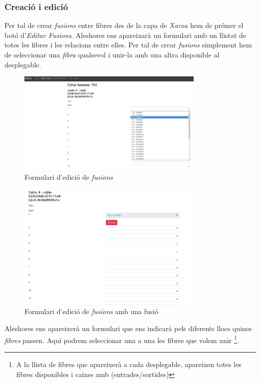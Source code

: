 \documentclass[a4paper]{article}
\begin{document}
	\subsubsection{Creació i edició}
	Per tal de crear \emph{fusions} entre fibres des de la capa de \emph{Xarxa} hem de prémer el botó d'\emph{Editar Fusions}. Aleshores ens apareixarà un formulari amb un llistat de totes les fibres i les relacions entre elles. Per tal de crear \emph{fusions} simplement hem de seleccionar una \emph{fibra} qualsevol i unir-la amb una altra disponible al desplegable.
	
	\begin{figure}[H]
		\centering
		\includegraphics[width=0.8\textwidth]{images/fusions_edit_form_disponible.png}
		\caption{Formulari d'edició de \emph{fusions}}
	\end{figure}

	\begin{figure}[H]
		\centering
		\includegraphics[width=0.8\textwidth]{images/fusions_edit_form_fusion.png}
		\caption{Formulari d'edició de \emph{fusions} amb una fusió}
	\end{figure}

	Aleshores ens apareixerà un formulari que ens indicarà pels diferents llocs quines \emph{fibres} passen. Aquí podrem seleccionar una a una les fibres que volem unir \footnote{A la llista de fibres que apareixerà a cada desplegable, apareixen totes les fibres disponibles i caixes amb (entrades/sortides)}.
	
\end{document}
